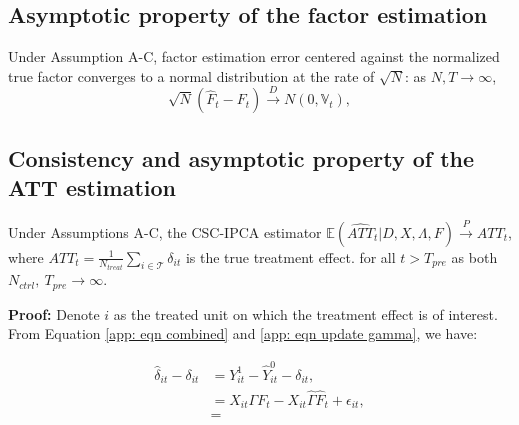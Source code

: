 \documentclass[12pt]{article}
\begin{document}
\subsection{Asymptotic property of the factor estimation}
\begin{proposition}
Under Assumption A-C, factor estimation error centered against the normalized true factor converges to a normal distribution at the rate of $\sqrt{N}$: as $N, T \to \infty$,
\begin{equation}
\sqrt{N}(\hat{F}_t - F_t) \xrightarrow{D} N(0, \mathbb{V}_t),
\end{equation}
\end{proposition}

\subsection{Consistency and asymptotic property of the ATT estimation}
\begin{theorem}
\label{thm: bias}
Under Assumptions A-C, the CSC-IPCA estimator $\mathbb{E}\left(\widehat{ATT}_{t} | D, X, \Lambda, F\right) \xrightarrow{P} ATT_{t}$, where $ATT_{t} = \frac{1}{N_{treat}}\sum_{i \in \mathcal{T}}\delta_{it}$ is the true treatment effect. for all $t > T_{pre}$ as both $N_{ctrl}, \ T_{pre} \to \infty$.
\end{theorem}

\textbf{Proof:} Denote $i$ as the treated unit on which the treatment effect is of interest. From Equation \ref{app: eqn combined} and \ref{app: eqn update gamma}, we have:



\begin{equation}
\begin{aligned}
\hat{\delta}_{it} - \delta_{it} &= Y_{it}^1 - \hat{Y}_{it}^0 - \delta_{it}, \\    
&= X_{it}\Gamma F_t - X_{it}\hat{\Gamma}\hat{F}_t + \epsilon_{it}, \\
&= 
\end{aligned}
\end{equation}


    
\end{document}

